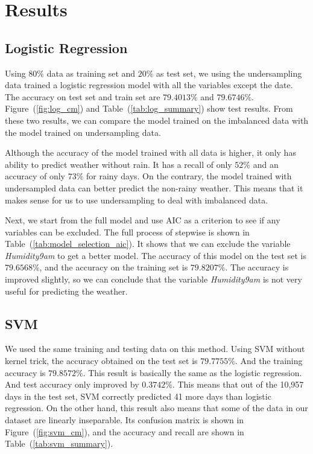 \documentclass[11pt, a4paper, jou]{apa7}
\begin{document}
\section{Results}

\subsection{Logistic Regression}
    Using $80\%$ data as training set and $20\%$ as test set, we using the undersampling data trained a logistic regression model with all the variables except the date. The accuracy on test set and train set are $79.4013\%$ and $79.6746\%$. Figure~(\ref{fig:log_cm}) and Table~(\ref{tab:log_summary}) show test results. From these two results, we can compare the model trained on the imbalanced data with the model trained on undersampling data. 

    Although the accuracy of the model trained with all data is higher, it only has ability to predict weather without rain. It has a recall of only $52\%$ and an accuracy of only $73\%$ for rainy days. On the contrary, the model trained with undersampled data can better predict the non-rainy weather. This means that it makes sense for us to use undersampling to deal with imbalanced data. 

    Next, we start from the full model and use AIC as a criterion to see if any variables can be excluded. The full process of stepwise is shown in Table~(\ref{tab:model_selection_aic}). It shows that we can exclude the variable \emph{Humidity9am} to get a better model. The accuracy of this model on the test set is $79.6568\%$, and the accuracy on the training set is $79.8207\%$. The accuracy is improved slightly, so we can conclude that the variable \emph{Humidity9am} is not very useful for predicting the weather.

\subsection{SVM}
    We used the same training and testing data on this method. Using SVM without kernel trick, the accuracy obtained on the test set is $79.7755\%$. And the training accuracy is $79.8572\%$. This result is basically the same as the logistic regression. And test accuracy only improved by $0.3742\%$. This means that out of the 10,957 days in the test set, SVM correctly predicted 41 more days than logistic regression. On the other hand, this result also means that some of the data in our dataset are linearly inseparable. Its confusion matrix is shown in Figure~(\ref{fig:svm_cm}), and the accuracy and recall are shown in Table~(\ref{tab:svm_summary}). 
\end{document}
